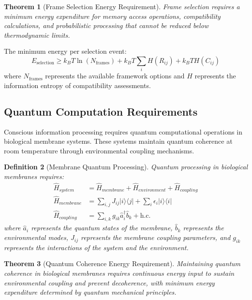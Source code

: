 \documentclass[12pt,a4paper]{article}
\newtheorem{theorem}{Theorem}[section]
\newtheorem{definition}[theorem]{Definition}
\begin{document}
\begin{theorem}[Frame Selection Energy Requirement]
Frame selection requires a minimum energy expenditure for memory access operations, compatibility calculations, and probabilistic processing that cannot be reduced below thermodynamic limits.
\end{theorem}

The minimum energy per selection event:
\begin{equation}
E_{\text{selection}} \geq k_B T \ln(N_{\text{frames}}) + k_B T \sum_i H(R_{ij}) + k_B T H(C_{ij})
\end{equation}
where $N_{\text{frames}}$ represents the available framework options and $H$ represents the information entropy of compatibility assessments.

\subsection{Quantum Computation Requirements}

Conscious information processing requires quantum computational operations in biological membrane systems. These systems maintain quantum coherence at room temperature through environmental coupling mechanisms.

\begin{definition}[Membrane Quantum Processing]
Quantum processing in biological membranes requires:
\begin{align}
\hat{H}_{system} &= \hat{H}_{membrane} + \hat{H}_{environment} + \hat{H}_{coupling} \\
\hat{H}_{membrane} &= \sum_{i,j} J_{ij} |i\rangle\langle j| + \sum_i \epsilon_i |i\rangle\langle i| \\
\hat{H}_{coupling} &= \sum_{i,k} g_{ik} \hat{a}_i^\dagger \hat{b}_k + \text{h.c.}
\end{align}
where $\hat{a}_i$ represents the quantum states of the membrane, $\hat{b}_k$ represents the environmental modes, $J_{ij}$ represents the membrane coupling parameters, and $g_{ik}$ represents the interactions of the system and the environment.
\end{definition}

\begin{theorem}[Quantum Coherence Energy Requirement]
Maintaining quantum coherence in biological membranes requires continuous energy input to sustain environmental coupling and prevent decoherence, with minimum energy expenditure determined by quantum mechanical principles.
\end{theorem}
\end{document}
